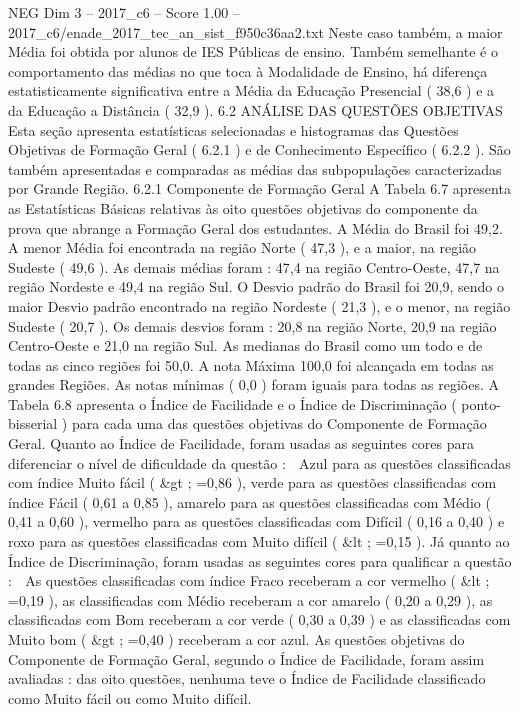 \begin{textsample}{NEG Dim 3 – 2017\_c6 – Score 1.00 – 2017\_c6/enade\_2017\_tec\_an\_sist\_f950c36aa2.txt}
Neste caso também, a maior Média foi obtida por alunos de IES Públicas de ensino.
Também semelhante é o comportamento das médias no que toca à Modalidade de Ensino, há diferença estatisticamente significativa entre a Média da Educação Presencial ( 38,6 ) e a da Educação a Distância ( 32,9 ). 6.2 ANÁLISE DAS QUESTÕES OBJETIVAS Esta seção apresenta estatísticas selecionadas e histogramas das Questões Objetivas de Formação Geral ( 6.2.1 ) e de Conhecimento Específico ( 6.2.2 ).
São também apresentadas e comparadas as médias das subpopulações caracterizadas por Grande Região. 6.2.1 Componente de Formação Geral A Tabela 6.7 apresenta as Estatísticas Básicas relativas às oito questões objetivas do componente da prova que abrange a Formação Geral dos estudantes.
A Média do Brasil foi 49,2.
A menor Média foi encontrada na região Norte ( 47,3 ), e a maior, na região Sudeste ( 49,6 ).
As demais médias foram : 47,4 na região Centro-Oeste, 47,7 na região Nordeste e 49,4 na região Sul.
O Desvio padrão do Brasil foi 20,9, sendo o maior Desvio padrão encontrado na região Nordeste ( 21,3 ), e o menor, na região Sudeste ( 20,7 ).
Os demais desvios foram : 20,8 na região Norte, 20,9 na região Centro-Oeste e 21,0 na região Sul.
As medianas do Brasil como um todo e de todas as cinco regiões foi 50,0.
A nota Máxima 100,0 foi alcançada em todas as grandes Regiões.
As notas mínimas ( 0,0 ) foram iguais para todas as regiões.
A Tabela 6.8 apresenta o Índice de Facilidade e o Índice de Discriminação ( ponto-bisserial ) para cada uma das questões objetivas do Componente de Formação Geral.
Quanto ao Índice de Facilidade, foram usadas as seguintes cores para diferenciar o nível de dificuldade da questão :  Azul para as questões classificadas com índice Muito fácil ( \&gt ; =0,86 ), verde para as questões classificadas com índice Fácil ( 0,61 a 0,85 ), amarelo para as questões classificadas com Médio ( 0,41 a 0,60 ), vermelho para as questões classificadas com Difícil ( 0,16 a 0,40 ) e roxo para as questões classificadas com Muito difícil ( \&lt ; =0,15 ).
Já quanto ao Índice de Discriminação, foram usadas as seguintes cores para qualificar a questão :  As questões classificadas com índice Fraco receberam a cor vermelho ( \&lt ; =0,19 ), as classificadas com Médio receberam a cor amarelo ( 0,20 a 0,29 ), as classificadas com Bom receberam a cor verde ( 0,30 a 0,39 ) e as classificadas com Muito bom ( \&gt ; =0,40 ) receberam a cor azul.
As questões objetivas do Componente de Formação Geral, segundo o Índice de Facilidade, foram assim avaliadas : das oito questões, nenhuma teve o Índice de Facilidade classificado como Muito fácil ou como Muito difícil.

\end{textsample}

